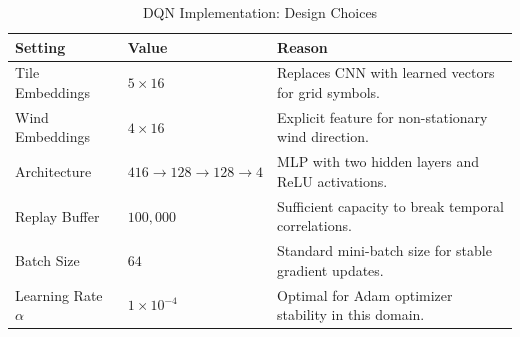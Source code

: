 \documentclass{article}
\begin{document}
\vspace{2em}

\begin{table}[H]
    \centering
    \small
    \caption{DQN Implementation: Design Choices}
    \label{tab:dqn_params}
    \begin{tabularx}{\textwidth}{l l X}
        \toprule
        \textbf{Setting} & \textbf{Value} & \textbf{Reason} \\
        \midrule
            Tile Embeddings & $5 \times 16$ 
                & Replaces CNN with learned vectors for grid symbols. \\[4pt]
            Wind Embeddings & $4 \times 16$
                & Explicit feature for non-stationary wind direction. \\[4pt]
            Architecture & $416 \to 128 \to 128 \to 4$
                & MLP with two hidden layers and ReLU activations. \\[4pt]
            Replay Buffer & $100{,}000$
                & Sufficient capacity to break temporal correlations. \\[4pt]
            Batch Size & $64$
                & Standard mini-batch size for stable gradient updates. \\[4pt]
            Learning Rate $\alpha$ & $1\times10^{-4}$
                & Optimal for Adam optimizer stability in this domain. \\
        \bottomrule
    \end{tabularx}
\end{table}
\end{document}
